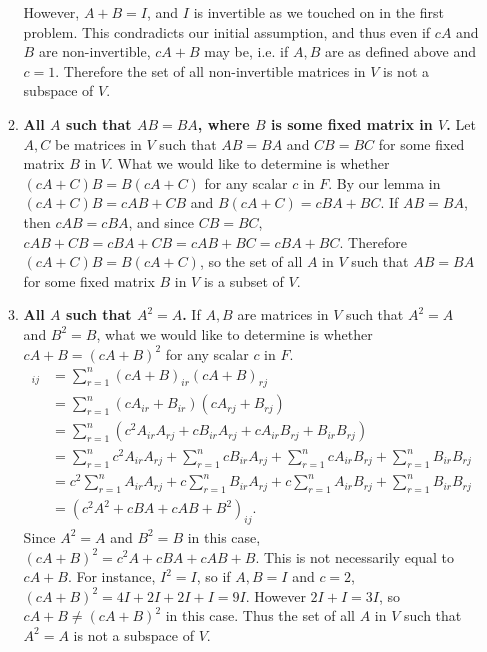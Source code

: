 \documentclass[12pt]{article}
\begin{document}
\begin{enumerate}
\begin{enumerate}
          However, $A + B = I$, and $I$ is invertible as we touched on in the first
          problem. This condradicts our initial assumption, and thus even if $cA$ and
          $B$ are non-invertible, $cA + B$ may be, i.e. if $A,B$ are as defined above
          and $c = 1$. Therefore the set of all non-invertible matrices in $V$ is not
          a subspace of $V$.

        \item
          \textbf{All $A$ such that $AB = BA$, where $B$ is some fixed matrix in
          $V$.} Let $A,C$ be matrices in $V$ such that $AB = BA$ and $CB = BC$ for
          some fixed matrix $B$ in $V$. What we would like to determine is whether
          $(cA + C)B = B(cA + C)$ for any scalar $c$ in $F$. By our lemma in
           $(cA + C)B = cAB + CB$ and $B(cA + C) = cBA + BC$. If
          $AB = BA$, then $cAB = cBA$, and since $CB = BC$, $cAB + CB = cBA + CB =
          cAB + BC = cBA + BC$. Therefore $(cA + C)B = B(cA + C)$, so the set of all
          $A$ in $V$ such that $AB = BA$ for some fixed matrix $B$ in $V$ is a subset
          of $V$.

        \item
          \textbf{All $A$ such that $A^2 = A$.} If $A,B$ are matrices in $V$ such
          that $A^2 = A$ and $B^2 = B$, what we would like to determine is whether
          $cA + B = (cA + B)^2$ for any scalar $c$ in $F$.
          \begin{align*}
            [(cA + B)^2]_{ij}
            &= \sum_{r = 1}^{n}(cA + B)_{ir}(cA + B)_{rj}\\
            &= \sum_{r = 1}^{n}(cA_{ir} + B_{ir})(cA_{rj} + B_{rj})\\
            &= \sum_{r = 1}^{n}(c^2A_{ir}A_{rj}
              + cB_{ir}A_{rj} + cA_{ir}B_{rj} + B_{ir}B_{rj})\\
            &= \sum_{r = 1}^{n}c^2A_{ir}A_{rj} +
              \sum_{r = 1}^{n} cB_{ir}A_{rj} +
              \sum_{r = 1}^{n} cA_{ir}B_{rj} +
              \sum_{r = 1}^{n} B_{ir}B_{rj}\\
            &= c^2\sum_{r = 1}^{n}A_{ir}A_{rj} +
              c\sum_{r = 1}^{n} B_{ir}A_{rj} +
              c\sum_{r = 1}^{n} A_{ir}B_{rj} +
              \sum_{r = 1}^{n} B_{ir}B_{rj}\\
            &= (c^2A^2 + cBA + cAB + B^2)_{ij}.
          \end{align*}
          Since $A^2 = A$ and $B^2 = B$ in this case, $(cA + B)^2 = c^2A + cBA + cAB
          + B$. This is not necessarily equal to $cA + B$. For instance, $I^2 = I$,
          so if $A,B = I$ and $c = 2$, $(cA + B)^2 = 4I + 2I + 2I + I = 9I$. However
          $2I + I = 3I$, so $cA + B \neq (cA + B)^2$ in this case. Thus the set of
          all $A$ in $V$ such that $A^2 = A$ is not a subspace of $V$.
        \end{enumerate}

  \end{enumerate}
\end{document}
